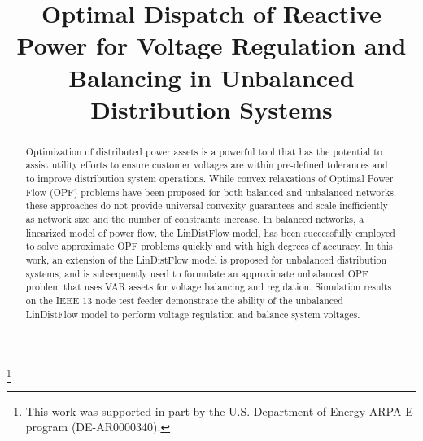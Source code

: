 \documentclass[10pt, conference]{IEEEtran}
\begin{document}
\title{Optimal Dispatch of Reactive Power for Voltage Regulation and Balancing in Unbalanced Distribution Systems}

\author{
}

\maketitle

\let\thefootnote\relax\footnote{This work was supported in part by the U.S. Department of Energy ARPA-E program (DE-AR0000340).}

\begin{abstract}
\noindent Optimization of distributed power assets is a powerful tool that has the potential to assist utility efforts to ensure customer voltages are within pre-defined tolerances and to improve distribution system operations. While convex relaxations of Optimal Power Flow (OPF) problems have been proposed for both balanced and unbalanced networks, these approaches do not provide universal convexity guarantees and scale inefficiently as network size and the number of  constraints increase.  In balanced networks, a linearized model of power flow, the LinDistFlow model, has been successfully employed to solve approximate OPF problems quickly and with high degrees of accuracy.  In this work, an extension of the LinDistFlow model is proposed for unbalanced distribution systems, and is  subsequently used to formulate an approximate unbalanced OPF problem that uses VAR assets for voltage  balancing and regulation.  Simulation results on the IEEE 13 node test feeder demonstrate the ability of the unbalanced LinDistFlow model to perform voltage regulation and balance system voltages.
\end{abstract}
\end{document}
